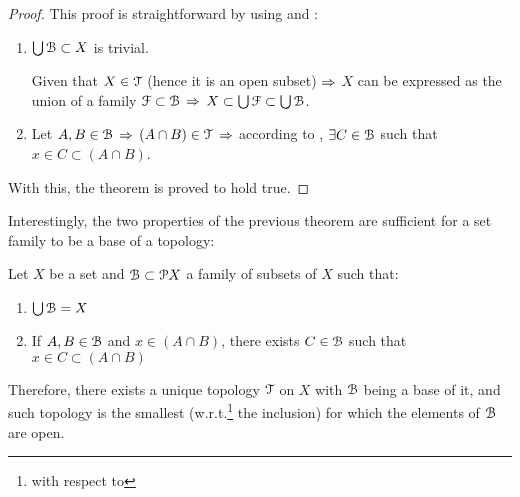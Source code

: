 \begin{proof}
	This proof is straightforward by using  and :
	\begin{enumerate}
		\item \noindent{$\boxed{\Rightarrow}$}  $\bigcup\EuScript{B} \subset X$ is trivial.

		\noindent{$\boxed{\Leftarrow}$} Given that $X\in \EuScript{T}$ (hence it is an open
		subset) $\Rightarrow$ $X$ can be expressed as the union of a family $\EuScript{F}\subset \EuScript{B}$
		$\Rightarrow$ $X \subset \bigcup \EuScript{F}\subset \bigcup \EuScript{B}$.

		\item Let $A, B\in \EuScript{B}$ $\Rightarrow$ $(A\cap B)\in \EuScript{T}$ $\Rightarrow$ according to
		, $\exists C\in \EuScript{B}$ such that $x\in C\subset(A\cap B)$.
	\end{enumerate}
	With this, the theorem is proved to hold true.
\end{proof}

Interestingly, the two properties of the previous theorem are sufficient for a set
family to be a base of a topology:

\begin{theorem}
	Let $X$ be a set and $\EuScript{B}\subset \EuScript{P} X$ a family of subsets of $X$ such that:
	\begin{enumerate}
		\item $\bigcup \EuScript{B} = X$
		\item If $A, B\in \EuScript{B}$ and $x\in (A\cap B)$, there exists $C\in \EuScript{B}$ such that
		$x\in C\subset (A\cap B)$
	\end{enumerate}
	Therefore, there exists a unique topology $\EuScript{T}$ on $X$ with $\EuScript{B}$ being a base of it,
	and such topology is the smallest (w.r.t.\footnote{with respect to} the inclusion)
	for which the elements of $\EuScript{B}$ are open.
	\label{th:1-3}
\end{theorem}

